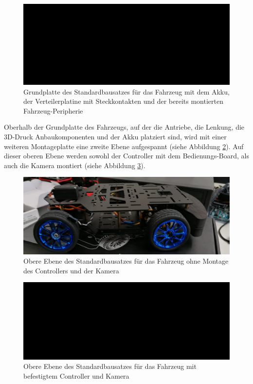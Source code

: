 \begin{figure}[H] %
\includegraphics[width=.90\textwidth]{sec2/images/Grundaufbau/Grundplatte02} 
\centering
\captionsetup{width=.95\textwidth}
\caption[Grundplatte des Standardbausatzes für das Fahrzeug]{Grundplatte des Standardbausatzes für das Fahrzeug mit dem Akku, der Verteilerplatine mit Steckkontakten und der bereits montierten Fahrzeug-Peripherie}\centering
\label{fig:Grundplatte02}
\end{figure}

Oberhalb der Grundplatte des Fahrzeugs, auf der die Antriebe, die Lenkung, die 3D-Druck Anbaukomponenten und der Akku platziert sind, wird mit einer weiteren Montageplatte eine zweite Ebene aufgespannt (siehe Abbildung \ref{fig:ObereEbene01}). Auf dieser oberen Ebene werden sowohl der Controller mit dem Bedienungs-Board, als auch die Kamera montiert (siehe Abbildung \ref{fig:ObereEbene02}).

\begin{figure}[H] %
\includegraphics[width=.92\textwidth]{sec2/images/Grundaufbau/ObereEbene01} 
\centering
\captionsetup{width=.95\textwidth}
\caption[Obere Ebene des Standardbausatzes für das Fahrzeug]{Obere Ebene des Standardbausatzes für das Fahrzeug ohne Montage des Controllers und der Kamera}\centering
\label{fig:ObereEbene01}
\end{figure}

\begin{figure}[H] %
\includegraphics[width=.92\textwidth]{sec2/images/Grundaufbau/ObereEbene02} 
\centering
\captionsetup{width=.95\textwidth}
\caption[Obere Ebene des Standardbausatzes für das Fahrzeug]{Obere Ebene des Standardbausatzes für das Fahrzeug mit befestigtem Controller und Kamera}\centering
\label{fig:ObereEbene02}
\end{figure}

